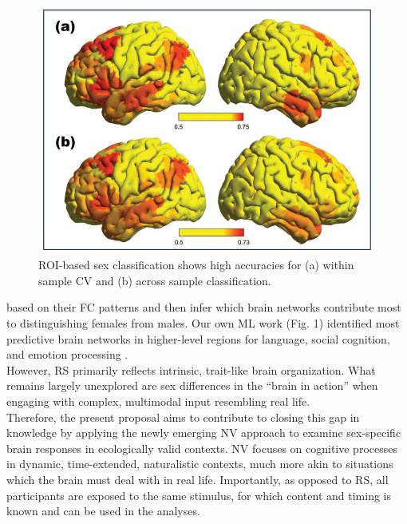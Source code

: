 \documentclass[11pt,a4paper]{article}
\begin{document}
\begin{figure} %
  \vspace{-10pt} %
  \includegraphics[width=\linewidth]{sex_classification.png}
  \caption{ROI-based sex classification shows high accuracies for (a) within sample CV and (b) across sample classification.}
  \label{fig:sexclass}
\end{figure}
based on their FC patterns and then infer which brain networks contribute most to distinguishing females from males.
Our own ML work (Fig. 1) identified most predictive brain networks in higher-level regions 
for language, social cognition, and emotion processing \parencite{weisSexClassificationResting2020a,wierschAccurateSexPrediction2023a,wierschSexDifferencesBrain2021a}.\\
However, RS primarily reflects intrinsic, trait-like brain organization. What remains largely unexplored are 
sex differences in the “brain in action” when engaging with complex, multimodal input resembling real life.\\ 
Therefore, the present proposal aims to contribute to closing this gap in knowledge by applying the newly 
emerging NV approach to examine sex-specific brain responses in ecologically valid contexts. 
NV focuses on cognitive processes in dynamic, time-extended, naturalistic contexts, much more akin to
situations which the brain must deal with in real life.
Importantly, as opposed to RS, all participants are exposed to the same stimulus, 
for which content and timing 
is known and can be used in the analyses.
\par\vspace{-\parskip}\noindent %
\end{document}
